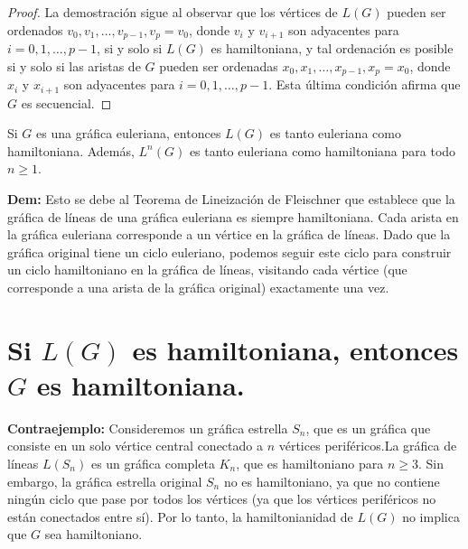 \documentclass[12pt,spanish]{article}
\begin{document}
\begin{proof}
La demostración sigue al observar que los vértices de \( L(G) \) pueden ser ordenados \( v_0, v_1, \ldots, v_{p-1}, v_p = v_0 \), donde \( v_i \) y \( v_{i+1} \) son adyacentes para \( i=0, 1, \ldots, p-1 \), si y solo si \( L(G) \) es hamiltoniana, y tal ordenación es posible si y solo si las aristas de \( G \) pueden ser ordenadas \( x_0, x_1, \ldots, x_{p-1}, x_p = x_0 \), donde \( x_i \) y \( x_{i+1} \) son adyacentes para \( i=0, 1, \ldots, p-1 \). Esta última condición afirma que \( G \) es secuencial.
\end{proof}

\begin{corolario}
Si \( G \) es una gráfica euleriana, entonces \( L(G) \) es tanto euleriana como hamiltoniana. Además, \( L^n(G) \) es tanto euleriana como hamiltoniana para todo \( n \geq 1 \).
\end{corolario}

\textbf{Dem:} Esto se debe al Teorema de Lineización de Fleischner que establece que la gráfica de líneas de una gráfica euleriana es siempre hamiltoniana. Cada arista en la gráfica euleriana corresponde a un vértice en la gráfica de líneas. Dado que la gráfica original tiene un ciclo euleriano, podemos seguir este ciclo para construir un ciclo hamiltoniano en la gráfica de líneas, visitando cada vértice (que corresponde a una arista de la gráfica original) exactamente una vez.

\section{Si \( L(G) \) es hamiltoniana, entonces \( G \) es hamiltoniana.}
\textbf{Contraejemplo:} Consideremos un gráfica estrella \( S_n \), que es un gráfica que consiste en un solo vértice central conectado a \( n \) vértices periféricos.La gráfica de líneas \( L(S_n) \) es un gráfica completa \( K_n \), que es hamiltoniano para \( n \geq 3 \). Sin embargo, la gráfica estrella original \( S_n \) no es hamiltoniano, ya que no contiene ningún ciclo que pase por todos los vértices (ya que los vértices periféricos no están conectados entre sí). Por lo tanto, la hamiltonianidad de \( L(G) \) no implica que \( G \) sea hamiltoniano.
\end{document}

